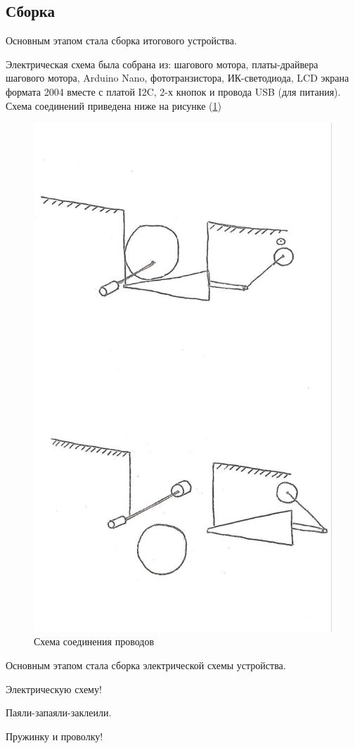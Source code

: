 \subsection{Сборка}

Основным этапом стала сборка итогового устройства.

Электрическая схема была собрана из: шагового мотора, платы-драйвера шагового мотора, Arduino Nano, фототранзистора, ИК-светодиода, LCD экрана формата 2004 вместе с платой I2C, 2-х кнопок и провода USB (для питания). Схема соединений приведена ниже на рисунке (\ref{ris:scheme_electric})

\begin{figure}[H]
	\centering
	\includegraphics[width=12cm]{scheme_idea.jpg}
	\caption{Схема соединения проводов}
	\label{ris:scheme_electric}
\end{figure}





Основным этапом стала сборка электрической схемы устройства. 

Электрическую схему!

Паяли-запаяли-заклеили. 

Пружинку и проволку!


